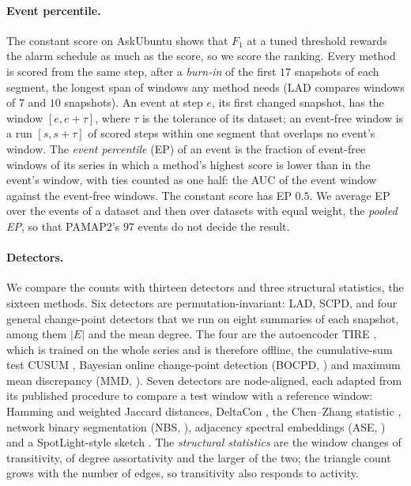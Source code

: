 \documentclass[11pt]{article}
\theoremstyle{dsplain}
\theoremstyle{definition}
\begin{document}
\paragraph{Event percentile.} The constant score on AskUbuntu shows that $F_1$ at a tuned threshold
rewards the alarm schedule as much as the score, so we score the ranking. Every method is scored from the
same step, after a \emph{burn-in} of the first $17$ snapshots of each segment, the longest span of windows any
method needs (LAD compares windows of $7$ and $10$ snapshots). An event at step $e$, its first changed snapshot, 
has the window $[e, e+\tau]$, where $\tau$ is the tolerance of its dataset; an event-free window is a run 
$[s, s+\tau]$ of scored steps within one segment that overlaps no event's window. The \emph{event percentile} 
(EP) of an event is the fraction of event-free windows of its series in which a method's highest score is 
lower than in the event's window, with ties counted as one half: the AUC of the event window against the 
event-free windows. The constant score has EP $0.5$. We average EP over the events of a dataset and then 
over datasets with equal weight, the \emph{pooled EP}, so that PAMAP2's $97$ events do not decide the result.

\paragraph{Detectors.} We compare the counts with thirteen detectors and three structural statistics, the sixteen methods. 
Six detectors are permutation-invariant: LAD, SCPD, and four general
change-point detectors that we run on eight summaries of each snapshot, among them $|E|$ and the mean
degree. The four are the autoencoder TIRE \citep{de2021autoencoder}, which is trained on the whole series 
and is therefore offline, the cumulative-sum test CUSUM \citep{page1954continuous}, Bayesian online 
change-point detection (BOCPD, \citealp{adams2007bayesian}) and maximum mean discrepancy 
(MMD, \citealp{gretton2012kernel}). Seven detectors are node-aligned, each adapted from its published 
procedure to compare a test window with a reference window: Hamming and weighted Jaccard distances, 
DeltaCon \citep{koutra2013deltacon}, the Chen--Zhang statistic \citep{chen2015graph}, network binary 
segmentation (NBS, \citealp{wang2021optimal}), adjacency spectral embeddings (ASE,
\citealp{sussman2012consistent,padilla2022change}) and a SpotLight-style sketch
\citep{eswaran2018spotlight}. The \emph{structural statistics} are the window changes of transitivity, of
degree assortativity and the larger of the two; the triangle count grows with the number of edges, so
transitivity also responds to activity. 
\end{document}

